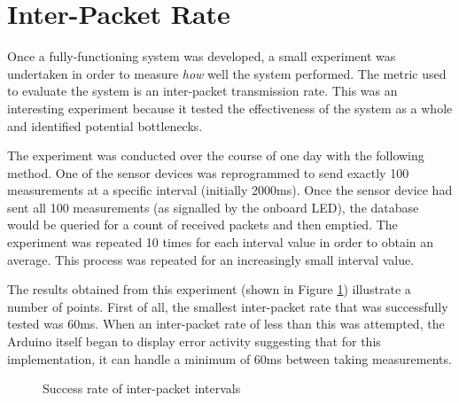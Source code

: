   \section{Inter-Packet Rate}
    Once a fully-functioning system was developed, a small experiment was undertaken in order to measure \textit{how} well the system performed. The metric used to evaluate the system is an inter-packet transmission rate. This was an interesting experiment because it tested the effectiveness of the system as a whole and identified potential bottlenecks.

    The experiment was conducted over the course of one day with the following method. One of the sensor devices was reprogrammed to send exactly 100 measurements at a specific interval (initially 2000ms). Once the sensor device had sent all 100 measurements (as signalled by the onboard LED), the database would be queried for a count of received packets and then emptied. The experiment was repeated 10 times for each interval value in order to obtain an average. This process was repeated for an increasingly small interval value.

    The results obtained from this experiment (shown in Figure \ref{figure:inter-packet-rate}) illustrate a number of points. First of all, the smallest inter-packet rate that was successfully tested was 60ms. When an inter-packet rate of less than this was attempted, the Arduino itself began to display error activity suggesting that for this implementation, it can handle a minimum of 60ms between taking measurements.

    \begin{figure}
      \centering
      \caption{Success rate of inter-packet intervals}
      \label{figure:inter-packet-rate}
    \end{figure}

